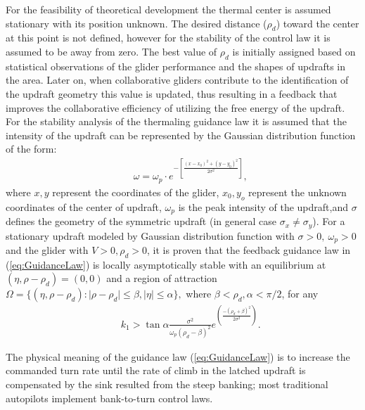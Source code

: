 \documentclass{ifacconf}
\begin{document}
For the feasibility of theoretical development the thermal center is assumed stationary
with its position unknown. The desired distance ($\rho_d$) toward the center at this
point is not defined, however for the stability of the control law it is assumed to be
away from zero. The best value of $\rho_d$ is initially assigned based on statistical
observations of the glider performance and the shapes of updrafts in the area. Later on,
when collaborative gliders contribute to the identification of the updraft geometry this
value is updated, thus resulting in a feedback that improves the collaborative efficiency
of utilizing the free energy of the updraft. For the stability analysis of the thermaling
guidance law it is assumed that the intensity of the updraft can be represented by the
Gaussian distribution function of the form:
\begin{eqnarray}
    && \omega=\omega_p \cdot e^{-[\frac{(x-x_0)^2+(y-y_0)^2}{2\sigma^2}]},
    \label{eq:GaussUpdraft}
\end{eqnarray}
where $x, y$ represent the coordinates of the glider, $x_0, y_o$ represent the unknown
coordinates of the center of updraft, $\omega_p$ is the peak intensity of the updraft,and
$\sigma$ defines the geometry of the symmetric updraft (in general case $\sigma_x \neq
\sigma_y$). For a stationary updraft modeled by Gaussian distribution function with
$\sigma>0,~\omega_p>0$ and the glider with $V>0, \rho_d>0$, it is proven that the
feedback guidance law in (\ref{eq:GuidanceLaw}) is locally asymptotically stable with an
equilibrium at $(\eta, \rho-\rho_d)=(0,0)$ and a region of attraction $\Omega=\{(\eta,
\rho-\rho_d): \vert \rho-\rho_d \vert \leq \beta,  \vert \eta \vert \leq \alpha \}, $
where $\beta < \rho_d, \alpha< \pi/2$, for any
\begin{eqnarray}
    && k_1 > \tan \alpha \frac{\sigma^2}{\omega_p(\rho_d-\beta)^2}
    e^(\frac{-(\rho_d+\beta)^2}{2\sigma^2} ).\nonumber
    \label{eq:GuidanceGain}
\end{eqnarray}

The physical meaning of the guidance law (\ref{eq:GuidanceLaw}) is to increase the
commanded turn rate until the rate of climb in the latched updraft is compensated by the
sink resulted from the steep banking; most traditional autopilots implement bank-to-turn
control laws.

\end{document}
